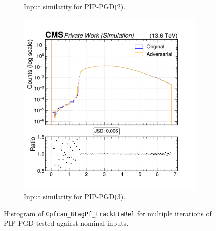 \begin{figure}[h]
\begin{subfigure}[t]{0.32\textwidth}
    \caption*{Input similarity for PIP-PGD(2).}
  \end{subfigure}\hfill
  \begin{subfigure}[t]{0.32\textwidth}
    \includegraphics[width=\linewidth]{media/output/features/compare/combined_it_3/cmp_cpf_arr_Cpfcan_BtagPf_trackEtaRel.pdf}
    \caption*{Input similarity for PIP-PGD(3).}
  \end{subfigure}

  \caption*{Histogram of \texttt{Cpfcan\_BtagPf\_trackEtaRel} for multiple iterations of PIP-PGD tested against nominal inputs.}
  \label{fig:combined_input_Cpfcan_BtagPf_trackEtaRel}
\end{figure}

